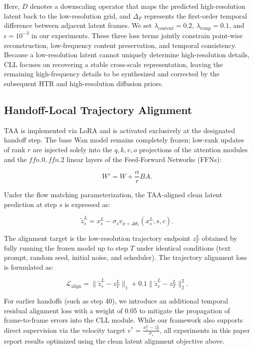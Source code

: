 Here, \(D\) denotes a downscaling operator that maps the predicted
high-resolution latent back to the low-resolution grid, and \(\Delta_F\)
represents the first-order temporal difference between adjacent latent
frames. We set \(\lambda_{\mathrm{content}}=0.2\),
\(\lambda_{\mathrm{temp}}=0.1\), and \(\epsilon=10^{-3}\) in our
experiments. These three loss terms jointly constrain point-wise
reconstruction, low-frequency content preservation, and temporal
consistency. Because a low-resolution latent cannot uniquely determine
high-resolution details, CLL focuses on recovering a stable cross-scale
representation, leaving the remaining high-frequency details to be
synthesized and corrected by the subsequent HTR and high-resolution
diffusion priors.

\subsection{Handoff-Local Trajectory Alignment}

TAA is implemented via LoRA \citep{hu2022lora} and is activated
exclusively at the designated handoff step. The base Wan model remains
completely frozen; low-rank updates of rank \(r\) are injected solely
into the \(q, k, v, o\) projections of the attention modules and the
\(ffn.0, ffn.2\) linear layers of the Feed-Forward Networks (FFNs):

\[
W'=W+\frac{\alpha}{r}BA.
\]

Under the flow matching parameterization, the TAA-aligned clean latent
prediction at step \(s\) is expressed as:

\[
\widetilde z_s^L
=x_s^L-\sigma_s v_{\phi+\Delta\theta_s}(x_s^L,s,c).
\]

The alignment target is the low-resolution trajectory endpoint \(z_T^L\)
obtained by fully running the frozen model up to step \(T\) under
identical conditions (text prompt, random seed, initial noise, and
scheduler). The trajectory alignment loss is formulated as:

\[
\mathcal L_{\mathrm{align}}
=\lVert\widetilde z_s^L-z_T^L\rVert_1
+0.1\lVert\widetilde z_s^L-z_T^L\rVert_2^2.
\]

For earlier handoffs (such as step 40), we introduce an additional
temporal residual alignment loss with a weight of 0.05 to mitigate the
propagation of frame-to-frame errors into the CLL module. While our
framework also supports direct supervision via the velocity target
\(v^*=\frac{x_s^L-z_T^L}{\sigma_s}\), all experiments in this paper
report results optimized using the clean latent alignment objective
above.

